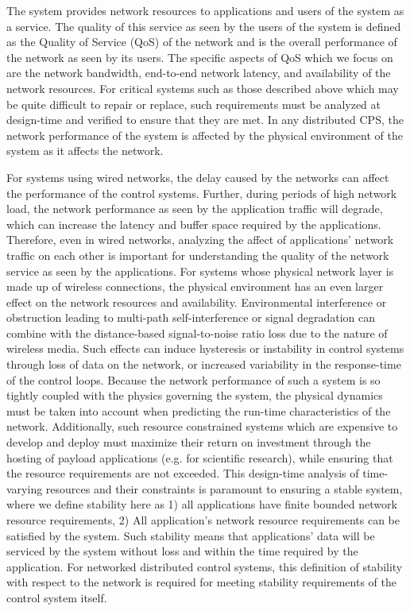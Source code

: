 The system provides network resources to applications and users of the
system as a service.  The quality of this service as seen by the users
of the system is defined as the Quality of Service (QoS) of the
network and is the overall performance of the network as seen by its
users.  The specific aspects of QoS which we focus on are the network
bandwidth, end-to-end network latency, and availability of the network
resources.  For critical systems such as those described above which
may be quite difficult to repair or replace, such requirements must be
analyzed at design-time and verified to ensure that they are met.  In
any distributed CPS, the network performance of the system is affected
by the physical environment of the system as it affects the network.

For systems using wired networks, the delay caused by the networks can
affect the performance of the control systems.  Further, during
periods of high network load, the network performance as seen by the
application traffic will degrade, which can increase the latency and
buffer space required by the applications.  Therefore, even in wired
networks, analyzing the affect of applications' network traffic on
each other is important for understanding the quality of the network
service as seen by the applications.  For systems whose physical
network layer is made up of wireless connections, the physical
environment has an even larger effect on the network resources and
availability.  Environmental interference or obstruction leading to
multi-path self-interference or signal degradation can combine with
the distance-based signal-to-noise ratio loss due to the nature of
wireless media.  Such effects can induce hysteresis or instability in
control systems through loss of data on the network, or increased
variability in the response-time of the control loops.  Because the
network performance of such a system is so tightly coupled with the
physics governing the system, the physical dynamics must be taken into
account when predicting the run-time characteristics of the network.
Additionally, such resource constrained systems which are expensive to
develop and deploy must maximize their return on investment through
the hosting of payload applications (e.g. for scientific research),
while ensuring that the resource requirements are not exceeded.  This
design-time analysis of time-varying resources and their constraints
is paramount to ensuring a stable system, where we define stability
here as 1) all applications have finite bounded network resource
requirements, 2) All application's network resource requirements can
be satisfied by the system.  Such stability means that applications'
data will be serviced by the system without loss and within the time
required by the application.  For networked distributed control
systems, this definition of stability with respect to the network is
required for meeting stability requirements of the control system
itself.  

